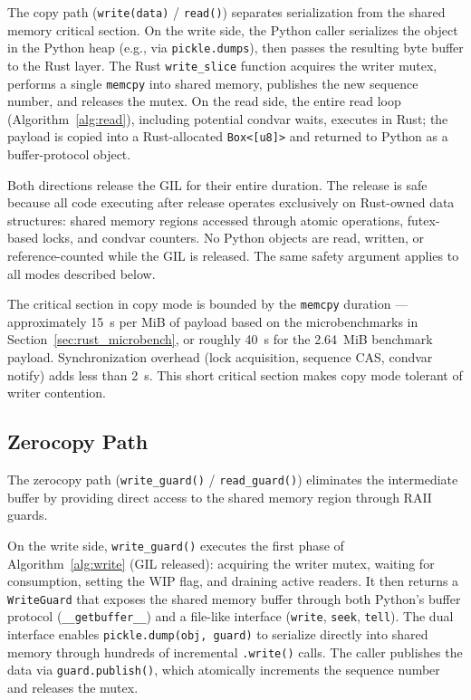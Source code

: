 The copy path (\texttt{write(data)} / \texttt{read()}) separates serialization from the shared memory critical section. On the write side, the Python caller serializes the object in the Python heap (e.g., via \texttt{pickle.dumps}), then passes the resulting byte buffer to the Rust layer. The Rust \texttt{write\_slice} function acquires the writer mutex, performs a single \texttt{memcpy} into shared memory, publishes the new sequence number, and releases the mutex. On the read side, the entire read loop (Algorithm~\ref{alg:read}), including potential condvar waits, executes in Rust; the payload is copied into a Rust-allocated \texttt{Box<[u8]>} and returned to Python as a buffer-protocol object.

Both directions release the GIL for their entire duration. The release is safe because all code executing after release operates exclusively on Rust-owned data structures: shared memory regions accessed through atomic operations, futex-based locks, and condvar counters. No Python objects are read, written, or reference-counted while the GIL is released. The same safety argument applies to all modes described below.

The critical section in copy mode is bounded by the \texttt{memcpy} duration --- approximately 15~\textmu s per MiB of payload based on the microbenchmarks in Section~\ref{sec:rust_microbench}, or roughly 40~\textmu s for the 2.64~MiB benchmark payload. Synchronization overhead (lock acquisition, sequence CAS, condvar notify) adds less than 2~\textmu s. This short critical section makes copy mode tolerant of writer contention.

\subsection{Zerocopy Path}
\label{subsec:zerocopy_path}

The zerocopy path (\texttt{write\_guard()} / \texttt{read\_guard()}) eliminates the intermediate buffer by providing direct access to the shared memory region through RAII guards.

On the write side, \texttt{write\_guard()} executes the first phase of Algorithm~\ref{alg:write} (GIL released): acquiring the writer mutex, waiting for consumption, setting the WIP flag, and draining active readers. It then returns a \texttt{WriteGuard} that exposes the shared memory buffer through both Python's buffer protocol (\texttt{\_\_getbuffer\_\_}) and a file-like interface (\texttt{write},\allowbreak{} \texttt{seek},\allowbreak{} \texttt{tell}). The dual interface enables \texttt{pickle.dump(obj,\allowbreak{} guard)} to serialize directly into shared memory through hundreds of incremental \texttt{.write()} calls. The caller publishes the data via \texttt{guard.publish()}, which atomically increments the sequence number and releases the mutex.

